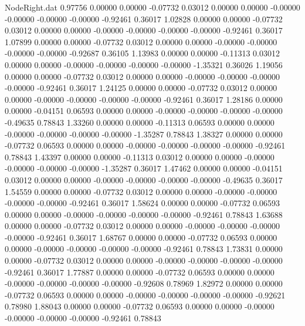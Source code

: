\begin{filecontents}{NodeRight.dat}
   0.97756    0.00000    0.00000    -0.07732    0.03012    0.00000    0.00000   -0.00000   -0.00000   -0.00000   -0.00000   -0.92461    0.36017
   1.02828    0.00000    0.00000    -0.07732    0.03012    0.00000    0.00000   -0.00000   -0.00000   -0.00000   -0.00000   -0.92461    0.36017
   1.07899    0.00000    0.00000    -0.07732    0.03012    0.00000    0.00000   -0.00000   -0.00000   -0.00000   -0.00000   -0.92687    0.36105
   1.13983    0.00000    0.00000    -0.11313    0.03012    0.00000    0.00000   -0.00000   -0.00000   -0.00000   -0.00000   -1.35321    0.36026
   1.19056    0.00000    0.00000    -0.07732    0.03012    0.00000    0.00000   -0.00000   -0.00000   -0.00000   -0.00000   -0.92461    0.36017
   1.24125    0.00000    0.00000    -0.07732    0.03012    0.00000    0.00000   -0.00000   -0.00000   -0.00000   -0.00000   -0.92461    0.36017
   1.28186    0.00000    0.00000    -0.04151    0.06593    0.00000    0.00000   -0.00000   -0.00000   -0.00000   -0.00000   -0.49635    0.78843
   1.33260    0.00000    0.00000    -0.11313    0.06593    0.00000    0.00000   -0.00000   -0.00000   -0.00000   -0.00000   -1.35287    0.78843
   1.38327    0.00000    0.00000    -0.07732    0.06593    0.00000    0.00000   -0.00000   -0.00000   -0.00000   -0.00000   -0.92461    0.78843
   1.43397    0.00000    0.00000    -0.11313    0.03012    0.00000    0.00000   -0.00000   -0.00000   -0.00000   -0.00000   -1.35287    0.36017
   1.47462    0.00000    0.00000    -0.04151    0.03012    0.00000    0.00000   -0.00000   -0.00000   -0.00000   -0.00000   -0.49635    0.36017
   1.54559    0.00000    0.00000    -0.07732    0.03012    0.00000    0.00000   -0.00000   -0.00000   -0.00000   -0.00000   -0.92461    0.36017
   1.58624    0.00000    0.00000    -0.07732    0.06593    0.00000    0.00000   -0.00000   -0.00000   -0.00000   -0.00000   -0.92461    0.78843
   1.63688    0.00000    0.00000    -0.07732    0.03012    0.00000    0.00000   -0.00000   -0.00000   -0.00000   -0.00000   -0.92461    0.36017
   1.68767    0.00000    0.00000    -0.07732    0.06593    0.00000    0.00000   -0.00000   -0.00000   -0.00000   -0.00000   -0.92461    0.78843
   1.73831    0.00000    0.00000    -0.07732    0.03012    0.00000    0.00000   -0.00000   -0.00000   -0.00000   -0.00000   -0.92461    0.36017
   1.77887    0.00000    0.00000    -0.07732    0.06593    0.00000    0.00000   -0.00000   -0.00000   -0.00000   -0.00000   -0.92608    0.78969
   1.82972    0.00000    0.00000    -0.07732    0.06593    0.00000    0.00000   -0.00000   -0.00000   -0.00000   -0.00000   -0.92621    0.78980
   1.88043    0.00000    0.00000    -0.07732    0.06593    0.00000    0.00000   -0.00000   -0.00000   -0.00000   -0.00000   -0.92461    0.78843

\end{filecontents}
